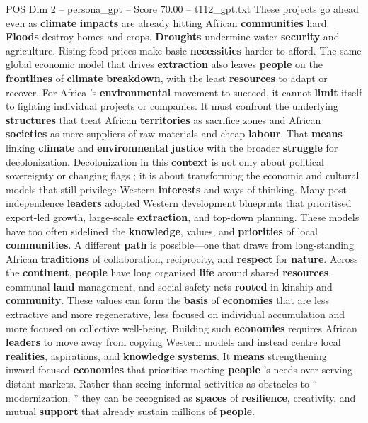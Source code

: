 \begin{textsample}{POS Dim 2 – persona\_gpt – Score 70.00 – t112\_gpt.txt}
These projects go ahead even as \textbf{climate} \textbf{impacts} are already hitting African \textbf{communities} hard. \textbf{Floods} destroy homes and crops. \textbf{Droughts} undermine water \textbf{security} and agriculture.
Rising food prices make basic \textbf{necessities} harder to afford.
The same global economic model that drives \textbf{extraction} also leaves \textbf{people} on the \textbf{frontlines} of \textbf{climate} \textbf{breakdown}, with the least \textbf{resources} to adapt or recover.
For Africa ’s \textbf{environmental} movement to succeed, it cannot \textbf{limit} itself to fighting individual projects or companies.
It must confront the underlying \textbf{structures} that treat African \textbf{territories} as sacrifice zones and African \textbf{societies} as mere suppliers of raw materials and cheap \textbf{labour}.
That \textbf{means} linking \textbf{climate} and \textbf{environmental} \textbf{justice} with the broader \textbf{struggle} for decolonization.
Decolonization in this \textbf{context} is not only about political sovereignty or changing flags ; it is about transforming the economic and cultural models that still privilege Western \textbf{interests} and ways of thinking.
Many post-independence \textbf{leaders} adopted Western development blueprints that prioritised export-led growth, large-scale \textbf{extraction}, and top-down planning.
These models have too often sidelined the \textbf{knowledge}, values, and \textbf{priorities} of local \textbf{communities}.
A different \textbf{path} is possible—one that draws from long-standing African \textbf{traditions} of collaboration, reciprocity, and \textbf{respect} for \textbf{nature}.
Across the \textbf{continent}, \textbf{people} have long organised \textbf{life} around shared \textbf{resources}, communal \textbf{land} management, and social safety nets \textbf{rooted} in kinship and \textbf{community}.
These values can form the \textbf{basis} of \textbf{economies} that are less extractive and more regenerative, less focused on individual accumulation and more focused on collective well-being.
Building such \textbf{economies} requires African \textbf{leaders} to move away from copying Western models and instead centre local \textbf{realities}, aspirations, and \textbf{knowledge} \textbf{systems}.
It \textbf{means} strengthening inward-focused \textbf{economies} that prioritise meeting \textbf{people} ’s needs over serving distant markets.
Rather than seeing informal activities as obstacles to “ modernization, ” they can be recognised as \textbf{spaces} of \textbf{resilience}, creativity, and mutual \textbf{support} that already sustain millions of \textbf{people}.

\end{textsample}
